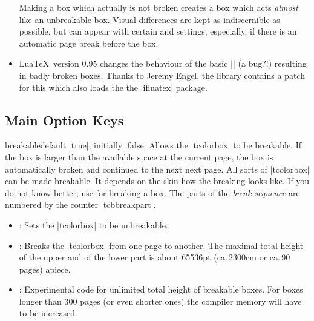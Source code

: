 \begin{itemize}
  Making a box  which actually is not broken creates
  a box which acts \emph{almost} like an unbreakable box. Visual differences
  are kept as indiscernible as possible, but can appear with certain
   and  settings, especially, if there
  is an automatic page break before the box.
\item{}
  Lua\TeX\ version 0.95 changes the behaviour of the basic |\vsplit| (a bug?!)
  resulting in badly broken boxes. Thanks to Jeremy Engel,
  the  library contains a patch for this which
  also loads the the |ifluatex| package.
\end{itemize}


\clearpage
\subsection{Main Option Keys}
\begin{docTcbKey}{breakable}{}{default |true|, initially |false|}
  Allows the |tcolorbox| to be breakable. If the box is larger than the
  available space at the current page, the box is automatically broken
  and continued to the next next page. All sorts of |tcolorbox| can be made
  breakable. It depends on the skin how the breaking looks like.
  If you do not know better, use  for breaking a box.
  The parts of the \emph{break sequence} are numbered
  by the counter |tcbbreakpart|.
  \begin{itemize}
  \item{}: Sets the |tcolorbox| to be unbreakable.
  \item{}: Breaks the |tcolorbox| from one page to another.
    The maximal total height of the upper and of the lower part is
    about 65536pt (ca.\,2300cm or ca.\,90 pages) apiece.
  \item{}: Experimental code for unlimited total height of
    breakable boxes.
    For boxes longer than 300 pages (or even shorter ones) the
    compiler memory will have to be increased.
  \end{itemize}

\begin{dispListing}

\begin{tcolorbox}[breakable,title=My breakable box]
\lipsum[1-6]
\end{tcolorbox}
\end{dispListing}
\end{docTcbKey}
{\tcbusetemp}


